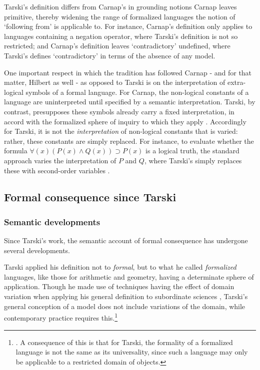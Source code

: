 	Tarski's definition differs from Carnap's in grounding notions Carnap leaves primitive, thereby widening the range of formalized languages the notion of `following from' is applicable to. For instance, Carnap's definition only applies to languages containing a negation operator, where Tarski's definition is not so restricted; and Carnap's definition leaves `contradictory' undefined, where Tarski's defines `contradictory' in terms of the absence of any model.
	
	One important respect in which the tradition has followed Carnap - and for that matter, Hilbert as well - as opposed to Tarski is on the interpretation of extra-logical symbols of a formal language. For Carnap, the non-logical constants of a language are uninterpreted until specified by a semantic interpretation. Tarski, by contrast, presupposes these symbols already carry a fixed interpretation, in accord with the formalized sphere of inquiry to which they apply \cite[167]{Tarski2002}. Accordingly for Tarski, it is not the \textit{interpretation} of non-logical constants that is varied: rather, these constants are simply replaced. For instance, to evaluate whether the formula $\forall(x)(P(x) \wedge Q(x)) \supset P(x)$ is a logical truth, the standard approach varies the interpretation of $P$ and $Q$, where Tarski's simply replaces these with second-order variables \cite[68-69]{Etchemendy1988}.
	
	\subsection{Formal consequence since Tarski}
	\subsubsection{Semantic developments}
	Since Tarski's work, the semantic account of formal consequence has undergone several developments. 
	
	Tarski applied his definition not to \textit{formal}, but to what he called \textit{formalized} languages, like those for arithmetic and geometry, having a determinate sphere of application. Though he made use of techniques having the effect of domain variation when applying his general definition to subordinate sciences \cite{Gomez-Torrente2009}, Tarski's general conception of a model does not include variations of the domain, while contemporary practice requires this.\footnote{\cite{Etchemendy1988} \cite{Etchemendy2008}. A consequence of this is that for Tarski, the formality of a formalized language is not the same as its universality, since such a language may only be applicable to a restricted domain of objects.}
	
